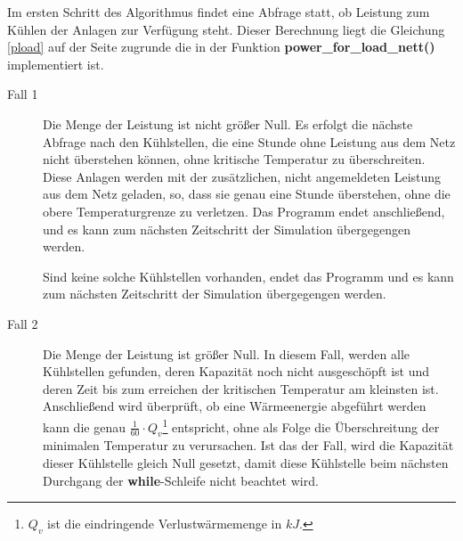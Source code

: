 Im ersten Schritt des Algorithmus findet eine Abfrage statt, ob Leistung zum
K\"uhlen der Anlagen zur Verf\"ugung steht. Dieser Berechnung liegt die
Gleichung \cref{pload} auf der Seite \pageref{pload} zugrunde die in der
Funktion \textbf{power\_for\_load\_nett()} implementiert ist.
\begin{description}
\item[Fall 1] Die Menge der Leistung ist nicht gr\"o\ss er Null. Es erfolgt die
n\"achste Abfrage nach den K\"uhlstellen, die eine Stunde ohne Leistung aus dem
Netz nicht \"uberstehen k\"onnen, ohne kritische Temperatur zu \"uberschreiten.
Diese Anlagen werden mit der zus\"atzlichen, nicht angemeldeten Leistung aus dem
Netz geladen, so, dass sie genau eine Stunde \"uberstehen, ohne die obere
Temperaturgrenze zu verletzen. Das Programm endet anschlie\ss end, und es kann
zum n\"achsten Zeitschritt der Simulation \"ubergegengen werden.

Sind keine solche K\"uhlstellen vorhanden, endet das Programm und es kann zum
n\"achsten Zeitschritt der Simulation \"ubergegengen werden.

\item[Fall 2] Die Menge der Leistung ist gr\"o\ss er Null. In diesem Fall,
werden alle K\"uhlstellen gefunden, deren Kapazit\"at noch nicht ausgesch\"opft
ist und deren Zeit bis zum erreichen der kritischen Temperatur am kleinsten ist.
Anschlie\ss end wird \"uberpr\"uft, ob eine W\"armeenergie abgef\"uhrt werden
kann die genau $\frac{1}{60}\cdot Q_v$\footnote{ $Q_v$ ist die eindringende
Verlustw\"armemenge in $kJ$.} entspricht, ohne als Folge die
\"Uberschreitung der minimalen Temperatur zu verursachen. Ist das der Fall, wird
die Kapazit\"at dieser K\"uhlstelle gleich Null gesetzt, damit diese
K\"uhlstelle beim n\"achsten Durchgang der \textbf{while}-Schleife nicht
beachtet wird.


\end{description}
